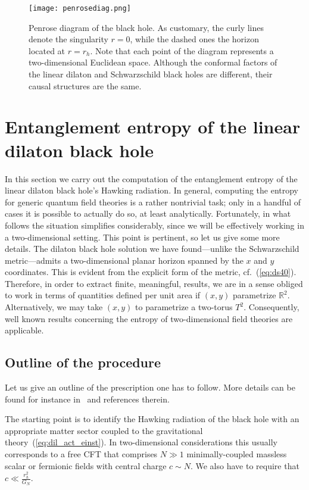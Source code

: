 \documentclass[a4paper, 12pt]{article}
\begin{document}
\begin{figure}[!t]
\centering
\texttt{[image: penrosediag.png]}
\caption{Penrose diagram of the black hole. As customary, the curly lines denote the singularity $r=0$, while the dashed ones the horizon located at $r=r_h$. Note that each point of the diagram represents a two-dimensional Euclidean space. Although the conformal factors of the linear dilaton and Schwarzschild black holes are different, their causal structures are the same.}
\label{fig:Penrose_1}
\end{figure}


\section{Entanglement entropy of the linear dilaton black hole}
\label{sec:entangl_entropy}


In this section we carry out the computation of the entanglement entropy of the linear dilaton black hole's Hawking radiation. In general, computing the entropy for generic quantum field theories is a rather nontrivial task; only in a handful of cases it is possible to actually do so, at least analytically. Fortunately, in what follows the situation simplifies considerably, since we will be effectively working in a two-dimensional setting. This point is pertinent, so let us give some more details.  The dilaton black hole solution we have found---unlike the Schwarzschild metric---admits a two-dimensional planar horizon spanned by the $x$ and $y$ coordinates. This is evident from the explicit form of the metric, cf.~(\ref{eq:ds40}). Therefore, in order to extract finite, meaningful, results, we are in a sense obliged to work in terms of  quantities  defined per unit area if $(x,y)$ parametrize $\mathbb{R}^2$. Alternatively, we may take $(x,y)$ to parametrize a two-torus $T^2$. Consequently,  well known results concerning the entropy of two-dimensional field theories are applicable. 

\subsection{Outline of the procedure}

Let us give an outline of the prescription one has to follow. More details can be found for instance in~\cite{Almheiri:2019qdq,Almheiri:2020cfm} and references therein. 

The starting point is to identify the Hawking radiation of the black hole with an appropriate matter sector coupled to the gravitational theory~(\ref{eq:dil_act_einst}). In two-dimensional considerations this usually corresponds to a free CFT that comprises $N\gg 1$ minimally-coupled massless scalar or fermionic fields with central charge $c\sim N$. We also have to require that $c\ll \frac{r_h^2}{G_N}$. 
\end{document}
